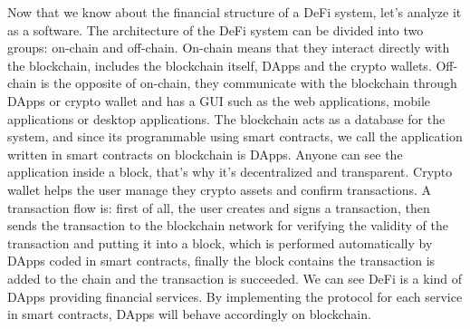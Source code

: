 

Now that we know about the financial structure of a DeFi system, let's analyze it as a software. The architecture of the DeFi system can be divided into two groups: on-chain and off-chain. On-chain means that they interact directly with the blockchain, includes the blockchain itself, DApps and the crypto wallets. Off-chain is the opposite of on-chain, they communicate with the blockchain through DApps or crypto wallet and has a GUI such as the web applications, mobile applications or desktop applications. The blockchain acts as a database for the system, and since its programmable using smart contracts, we call the application written in smart contracts on blockchain is DApps. Anyone can see the application inside a block, that's why it's decentralized and transparent. Crypto wallet helps the user manage they crypto assets and confirm transactions. A transaction flow is: first of all, the user creates and signs a transaction, then sends the transaction to the blockchain network for verifying the validity of the transaction and putting it into a block, which is performed automatically by DApps coded in smart contracts, finally the block contains the transaction is added to the chain and the transaction is succeeded. We can see DeFi is a kind of DApps providing financial services. By implementing the protocol for each service in smart contracts, DApps will behave accordingly on blockchain.

